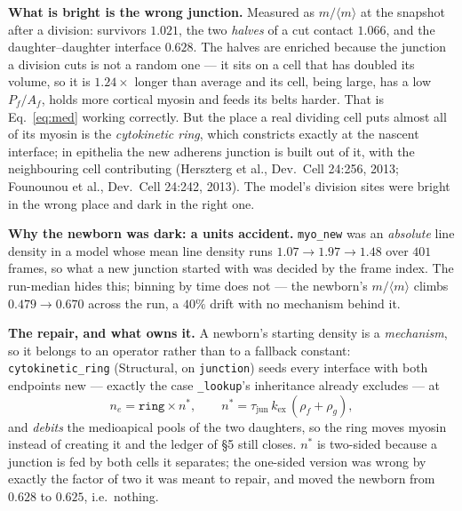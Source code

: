 \documentclass[10pt,a4paper]{article}
\newcommand{\code}[1]{\texttt{#1}}
\begin{document}
\textbf{What is bright is the wrong junction.} Measured as $m/\langle m\rangle$ at the snapshot after a
division: survivors $1.021$, the two \emph{halves} of a cut contact $1.066$, and the
daughter--daughter interface $0.628$. The halves are enriched because the junction a division cuts is
not a random one --- it sits on a cell that has doubled its volume, so it is $1.24\times$ longer than
average and its cell, being large, has a low $P_f/A_f$, holds more cortical myosin and feeds its belts
harder. That is Eq.~\eqref{eq:med} working correctly. But the place a real dividing cell puts almost
all of its myosin is the \emph{cytokinetic ring}, which constricts exactly at the nascent interface;
in epithelia the new adherens junction is built out of it, with the neighbouring cell contributing
(Herszterg et al., Dev.\ Cell 24:256, 2013; Founounou et al., Dev.\ Cell 24:242, 2013). The model's
division sites were bright in the wrong place and dark in the right one.

\textbf{Why the newborn was dark: a units accident.} \code{myo\_new} was an \emph{absolute} line
density in a model whose mean line density runs $1.07\to1.97\to1.48$ over $401$ frames, so what a new
junction started with was decided by the frame index. The run-median hides this; binning by time does
not --- the newborn's $m/\langle m\rangle$ climbs $0.479\to0.670$ across the run, a $40\%$ drift with
no mechanism behind it.

\textbf{The repair, and what owns it.} A newborn's starting density is a \emph{mechanism}, so it
belongs to an operator rather than to a fallback constant: \code{cytokinetic\_ring} (Structural, on
\code{junction}) seeds every interface with both endpoints new --- exactly the case
\code{\_lookup}'s inheritance already excludes --- at
%
\begin{equation}
n_e = \texttt{ring}\times n^{\ast}, \qquad
n^{\ast}=\tau_{\text{jun}}\,k_{\text{ex}}\,(\rho_f+\rho_g),
\label{eq:ring}
\end{equation}
%
and \emph{debits} the medioapical pools of the two daughters, so the ring moves myosin instead of
creating it and the ledger of \S5 still closes. $n^{\ast}$ is two-sided because a junction is fed by
both cells it separates; the one-sided version was wrong by exactly the factor of two it was meant to
repair, and moved the newborn from $0.628$ to $0.625$, i.e.\ nothing.
\end{document}
